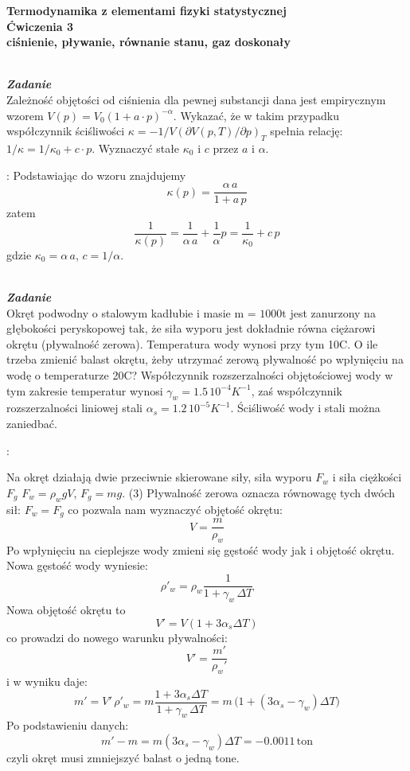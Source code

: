 \documentclass[11pt,a4paper]{article}
\newcounter{zadanie}\newcommand{\zadanie}[1][]{\addtocounter{zadanie}{1} ~\\  {\bf \emph{Zadanie \arabic{zadanie} #1 }} \\}
\begin{document}
\vspace*{-1.8cm}

\begin{centering}
\bf{\Large{Termodynamika z elementami fizyki statystycznej}}\\
Ćwiczenia 3 \\[1mm]
ciśnienie, pływanie, równanie stanu, gaz doskonały \\
\end{centering}

\zadanie
Zależność objętości od ciśnienia dla pewnej substancji dana jest empirycznym wzorem $V(p) = V_0(1 + a\cdot p)^{-\alpha}$.
Wykazać, że w takim przypadku współczynnik ściśliwości $\kappa=-1/V(\partial V(p,T)/\partial p)_T$ spełnia relację: $1/\kappa=1/\kappa_0+c\cdot p$.
Wyznaczyć stałe $\kappa_0$ i $c$ przez $a$ i $\alpha$.

\vspace{2mm}{\bf Rozwiązanie}: Podstawiając do wzoru znajdujemy
\[
\kappa(p)=\frac{\alpha\,a}{1+a\,p}
\]
zatem
\[
\frac{1}{\kappa(p)}=\frac{1}{\alpha\,a}+\frac{1}{\alpha}p=\frac{1}{\kappa_0}+c\,p
\]
gdzie $\kappa_0=\alpha\,a$, $c=1/\alpha$.

\clearpage

\zadanie
Okręt podwodny o stalowym kadłubie i masie m = $1000\textrm{t}$ jest zanurzony na głębokości peryskopowej tak, że siła wyporu jest dokładnie równa ciężarowi okrętu (pływalność zerowa). Temperatura wody wynosi przy tym 10\degree C. O ile trzeba zmienić balast okrętu, żeby utrzymać zerową pływalność po wpłynięciu na wodę o temperaturze 20\degree C? Współczynnik rozszerzalności objętościowej wody w tym zakresie temperatur wynosi $\gamma_w = 1.5\,10^{-4} K^{-1}$, zaś współczynnik rozszerzalności liniowej stali $\alpha_s = 1.2\,10^{-5} K^{-1}$. Ściśliwość wody i stali można zaniedbać.

\vspace{2mm}{\bf Rozwiązanie}:

Na okręt działają dwie przeciwnie skierowane siły, siła wyporu $F_w$ i siła ciężkości $F_g$
$F_w = \rho_w g V$, $F_g = mg$. (3) Pływalność zerowa oznacza równowagę tych dwóch sił: $F_w = F_g$ co pozwala nam wyznaczyć objętość okrętu:
\[
V = \frac{m}{\rho_w}
\]
Po wpłynięciu na cieplejsze wody zmieni się gęstość wody jak i objętość okrętu. Nowa gęstość wody wyniesie:
\[
\rho'_w = \rho_w \frac{1}{1+\gamma_w\,\Delta T}
\]
Nowa objętość okrętu to
\[
V' = V (1+3\alpha_s \Delta T)
\]
co prowadzi do nowego warunku pływalności:
\[
V' = \frac{m'}{\rho_w'}
\]
i w wyniku daje:
\[
m' = V'\,\rho'_w = m \frac{1+3\alpha_s \Delta T}{1+\gamma_w\,\Delta T} = m\,\big(1+(3\alpha_s-\gamma_w) \Delta T\big)
\]
Po podstawieniu danych:
\[
m'-m=m (3\alpha_s-\gamma_w) \Delta T = -0.0011\,\textrm{ton}
\]
czyli okręt musi zmniejszyć balast o jedną tone.
\end{document}
